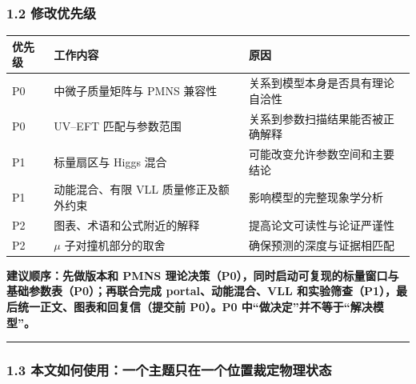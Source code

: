 \documentclass[
  chinese,
  UTF8]{ctexart}
\newcounter{none} %
\begin{document}
\subsubsection{1.2 修改优先级}\label{ux4feeux6539ux4f18ux5148ux7ea7}

{\def\LTcaptype{none} %
\begin{longtable}[]{@{}
  >{\raggedright\arraybackslash}p{}
  >{\raggedright\arraybackslash}p{}
  >{\raggedright\arraybackslash}p{}@{}}
\toprule\noalign{}
\begin{minipage}[b]{\linewidth}\raggedright
优先级
\end{minipage} & \begin{minipage}[b]{\linewidth}\raggedright
工作内容
\end{minipage} & \begin{minipage}[b]{\linewidth}\raggedright
原因
\end{minipage} \\
\midrule\noalign{}
\endhead
\bottomrule\noalign{}
\endlastfoot
P0 & 中微子质量矩阵与 PMNS 兼容性 & 关系到模型本身是否具有理论自洽性 \\
P0 & UV--EFT 匹配与参数范围 & 关系到参数扫描结果能否被正确解释 \\
P1 & 标量扇区与 Higgs 混合 & 可能改变允许参数空间和主要结论 \\
P1 & 动能混合、有限 VLL 质量修正及额外约束 & 影响模型的完整现象学分析 \\
P2 & 图表、术语和公式附近的解释 & 提高论文可读性与论证严谨性 \\
P2 & \ensuremath{\mu} 子对撞机部分的取舍 & 确保预测的深度与证据相匹配 \\
\end{longtable}
}

\textbf{建议顺序：先做版本和 PMNS
理论决策（P0），同时启动可复现的标量窗口与基础参数表（P0）；再联合完成
portal、动能混合、VLL
和实验筛查（P1），最后统一正文、图表和回复信（提交前 P0）。P0
中``做决定''并不等于``解决模型''。}

\begin{center}\rule{0.5\linewidth}{0.5pt}\end{center}

\subsubsection{1.3
本文如何使用：一个主题只在一个位置裁定物理状态}\label{ux672cux6587ux5982ux4f55ux4f7fux7528ux4e00ux4e2aux4e3bux9898ux53eaux5728ux4e00ux4e2aux4f4dux7f6eux88c1ux5b9aux7269ux7406ux72b6ux6001}
\end{document}
